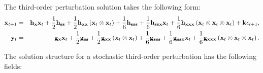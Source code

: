 \documentclass[notitlepage,11pt]{article}
\begin{document}
The third-order perturbation solution takes the following form:%
\begin{eqnarray*}
\mathbf{x}_{t+1} &=&\mathbf{h}_{\mathbf{x}}\mathbf{x}_{t}+\frac{1}{2}\mathbf{%
h}_{\mathbf{ss}}+\frac{1}{2}\mathbf{h}_{\mathbf{xx}}\left( \mathbf{x}%
_{t}\otimes \mathbf{x}_{t}\right) +\frac{1}{6}\mathbf{h}_{\mathbf{sss}}+%
\frac{1}{6}\mathbf{h}_{\mathbf{ssx}}\mathbf{x}_{t}+\frac{1}{6}\mathbf{h}_{%
\mathbf{xxx}}\left( \mathbf{x}_{t}\otimes \mathbf{x}_{t}\otimes \mathbf{x}%
_{t}\right) +\mathbf{k\epsilon }_{t+1}, \\
\mathbf{y}_{t} &=&\mathbf{g}_{\mathbf{x}}\mathbf{x}_{t}+\frac{1}{2}\mathbf{g}%
_{\mathbf{ss}}+\frac{1}{2}\mathbf{g}_{\mathbf{xx}}\left( \mathbf{x}%
_{t}\otimes \mathbf{x}_{t}\right) +\frac{1}{6}\mathbf{g}_{\mathbf{sss}}+%
\frac{1}{6}\mathbf{g}_{\mathbf{ssx}}\mathbf{x}_{t}+\frac{1}{6}\mathbf{g}_{%
\mathbf{xxx}}\left( \mathbf{x}_{t}\otimes \mathbf{x}_{t}\otimes \mathbf{x}%
_{t}\right) .
\end{eqnarray*}

The solution structure for a stochastic third-order perturbation has the
following fields:
\end{document}

